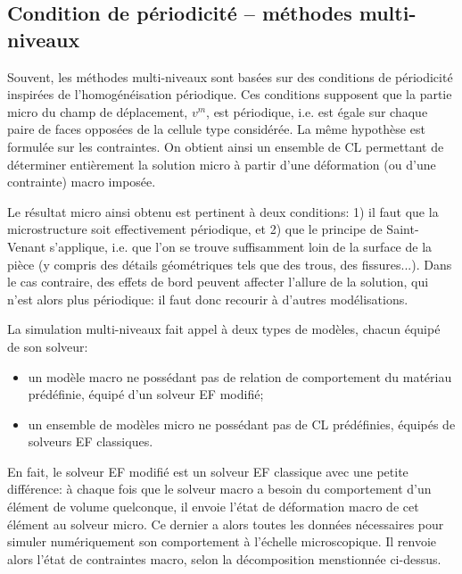 \medskip
\subsection{Condition de périodicité -- méthodes multi-niveaux}

Souvent, les méthodes multi-niveaux sont basées sur des conditions de périodicité 
inspirées de l'homogénéisation périodique. 
Ces conditions supposent que la partie micro du champ de déplacement, $v^m$, est périodique, 
i.e. est égale sur chaque paire de faces opposées de la cellule type considérée. 
La même hypothèse est formulée sur les contraintes. 
On obtient ainsi un ensemble de CL permettant de déterminer entièrement la solution micro à
partir d'une déformation (ou d'une contrainte) macro imposée.

Le résultat micro ainsi obtenu est pertinent à deux conditions: 
1) il faut que la microstructure soit effectivement périodique, et 2) que le principe de
Saint-Venant 
s'applique, i.e. que l'on se trouve suffisamment loin de la surface de la pièce 
(y compris des détails géométriques tels que des trous, des fissures...). 
Dans le cas contraire, des effets de bord peuvent affecter l'allure de la solution, qui n'est 
alors plus périodique: il faut donc recourir à d'autres modélisations.

\medskip
La simulation multi-niveaux fait appel à deux types de modèles, chacun équipé de son solveur:
\begin{itemize}
   \item un modèle macro ne possédant pas de relation de comportement du matériau
	prédéfinie, équipé d'un solveur EF modifié;
   \item un ensemble de modèles micro ne possédant pas de CL prédéfinies,
	équipés de solveurs EF classiques.
\end{itemize}

En fait, le solveur EF modifié est un solveur EF classique avec une petite différence:
à chaque fois que le solveur macro a besoin du comportement d'un élément de volume 
quelconque, il envoie l'état de déformation macro de cet élément au solveur micro. 
Ce dernier a alors toutes les données nécessaires pour simuler numériquement son comportement 
à l'échelle microscopique. Il renvoie alors l'état de contraintes macro, selon la décomposition
menstionnée ci-dessus.

